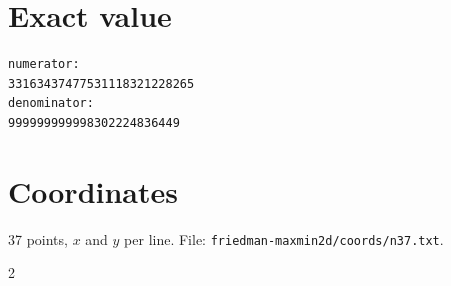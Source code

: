 \documentclass[11pt,a4paper]{article}
\begin{document}
\appendix
\section{Exact value}
{\small
\begin{verbatim}
numerator:
33163437477531118321228265
denominator:
999999999998302224836449
\end{verbatim}}

\section{Coordinates}
37 points, $x$ and $y$ per line. File: \texttt{friedman-maxmin2d/coords/n37.txt}.
{\tiny
\begin{multicols}{2}
\end{multicols}}
\end{document}
